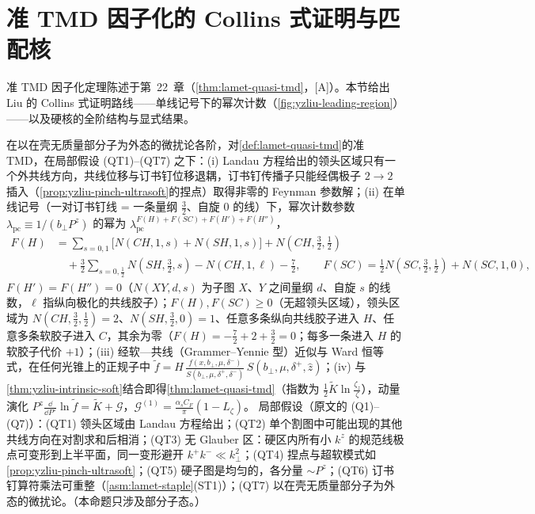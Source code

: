 \section{准 TMD 因子化的 Collins 式证明与匹配核}\label{sec:yzliu-quasi-tmd}

准 TMD 因子化定理陈述于第~22~章（\cref{thm:lamet-quasi-tmd}，[A]）。本节给出 Liu 的 Collins 式证明路线——单线记号下的幂次计数（\cref{fig:yzliu-leading-region}）——以及硬核的全阶结构与显式结果。


\begin{proposition}\label{prop:yzliu-qtmd-powercount}
在以在壳无质量部分子为外态的微扰论各阶，对\cref{def:lamet-quasi-tmd}的准 TMD，在局部假设 (QT1)--(QT7) 之下：(i) Landau 方程给出的领头区域只有一个外共线方向，共线位移与订书钉位移退耦，订书钉传播子只能经偶极子 $2\to2$ 插入（\cref{prop:yzliu-pinch-ultrasoft}的捏点）取得非零的 Feynman 参数解；(ii) 在单线记号（一对订书钉线 = 一条量纲 $\frac32$、自旋 $0$ 的线）下，幂次计数参数 $\lambda_{\mathrm{pc}}\equiv1/(b_\perp P^z)$ 的幂为 $\lambda_{\mathrm{pc}}^{F(H)+F(SC)+F(H')+F(H'')}$，%
\begin{equation}\label{eq:yzliu-FH}
\begin{aligned}
F(H)&=\sum_{s=0,1}\big[N(CH,1,s)+N(SH,1,s)\big]+N(CH,\tfrac32,\tfrac12)\\
&\quad+\tfrac32\sum_{s=0,\frac12}N(SH,\tfrac32,s)-N(CH,1,\ell)-\tfrac72 ,\qquad F(SC)=\tfrac12N(SC,\tfrac32,\tfrac12)+N(SC,1,0),
\end{aligned}
\end{equation}
$F(H')=F(H'')=0$（$N(XY,d,s)$ 为子图 $X$、$Y$ 之间量纲 $d$、自旋 $s$ 的线数，$\ell$ 指纵向极化的共线胶子）；$F(H),F(SC)\ge0$（无超领头区域），领头区域为 $N(CH,\frac32,\frac12)=2$、$N(SH,\frac32,0)=1$、任意多条纵向共线胶子进入 $H$、任意多条软胶子进入 $C$，其余为零（$F(H)=-\frac72+2+\frac32=0$；每多一条进入 $H$ 的软胶子代价 $+1$）；(iii) 经软—共线（Grammer--Yennie 型）近似与 Ward 恒等式，在任何光锥上的正规子中 $\tilde f=H\,\frac{f(x,b_\perp,\mu,\delta^-)}{S(b_\perp,\mu,\delta^+,\delta^-)}\,S(b_\perp,\mu,\delta^+,\hat z)$\cite[式~(74)]{Liu:2022nnk}；(iv) 与\cref{thm:yzliu-intrinsic-soft}结合即得\cref{thm:lamet-quasi-tmd}（指数为 $\frac12\tilde K\ln\frac{\zeta_z}{\zeta}$），动量演化 $P^z\frac{\dd}{\dd P^z}\ln\tilde f=\tilde K+\mathcal G$，$\mathcal G^{(1)}=\frac{\alpha_sC_F}{\pi}(1-L_\zeta)$。%
局部假设（原文的 (Q1)--(Q7)）：(QT1) 领头区域由 Landau 方程给出；(QT2) 单个割图中可能出现的其他共线方向在对割求和后相消；(QT3) 无 Glauber 区：硬区内所有小 $k^z$ 的规范线极点可变形到上半平面，同一变形避开 $k^+k^-\ll k_\perp^2$；(QT4) 捏点与超软模式如\cref{prop:yzliu-pinch-ultrasoft}；(QT5) 硬子图是均匀的，各分量 $\sim P^z$；(QT6) 订书钉算符乘法可重整（\cref{asm:lamet-staple}(ST1)）；(QT7) 以在壳无质量部分子为外态的微扰论。（本命题只涉及部分子态。）
\end{proposition}

